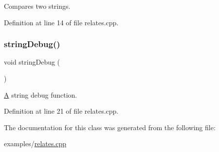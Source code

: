 Compares two strings. 

Definition at line 14 of file relates.\+cpp.

\mbox{\label{class_string_a5c07384b505d25ae6f61fc7abf0b0e61}} 
\subsubsection{\texorpdfstring{string\+Debug()}{stringDebug()}}
{\footnotesize\ttfamily void string\+Debug (\begin{DoxyParamCaption}{ }\end{DoxyParamCaption})\hspace{0.3cm}{\ttfamily [related]}}

\hyperlink{class_a}{A} string debug function. 

Definition at line 21 of file relates.\+cpp.



The documentation for this class was generated from the following file\+:\begin{DoxyCompactItemize}
\item 
examples/\hyperlink{relates_8cpp}{relates.\+cpp}\end{DoxyCompactItemize}
